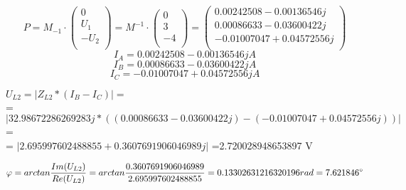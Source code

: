 \documentclass{article}
\begin{document}
\[
P = M_{-1} \cdot 
\begin{pmatrix}
  0\\
  U_1\\
  -U_2\\
\end{pmatrix}
= M^{-1}\cdot
\begin{pmatrix}
  0\\
  3\\
  -4\\
\end{pmatrix}
= 
\begin{pmatrix}
  0.00242508 -0.00136546j\\
  0.00086633 -0.03600422j\\
  -0.01007047 +0.04572556j\\
\end{pmatrix}
\]
\[
  I_A = 
  0.00242508 -0.00136546j A
\]
\[
  I_B = 
  0.00086633 -0.03600422j A
\]
\[
  I_C = −0.01007047 + 0.04572556j A
\]

  $U_{L2} = |Z_{L2} * (I_B-I_C)|=$\\
  = $|32.98672286269283j*((0.00086633-0.03600422j)-(-0.01007047+0.04572556j))|$=\\
  = $|2.695997602488855+0.3607691906046989j|$
  =2.720028948653897 V

  \[
    \varphi = arctan \displaystyle\frac{Im(U_{L2})}{Re(U_{L2})}
    = arctan \displaystyle\frac{0.3607691906046989}{2.695997602488855}
    = 0.13302631216320196rad
    = 7.621846\degree
  \]
\end{document}
